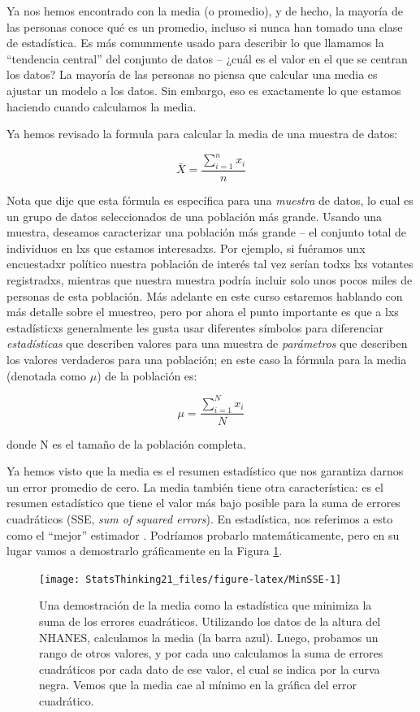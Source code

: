 \documentclass[
  12pt,
]{book}
\begin{document}
Ya nos hemos encontrado con la media (o promedio), y de hecho, la mayoría de las personas conoce qué es un promedio, incluso si nunca han tomado una clase de estadística. Es más comunmente usado para describir lo que llamamos la ``tendencia central'' del conjunto de datos -- ¿cuál es el valor en el que se centran los datos? La mayoría de las personas no piensa que calcular una media es ajustar un modelo a los datos. Sin embargo, eso es exactamente lo que estamos haciendo cuando calculamos la media.

Ya hemos revisado la formula para calcular la media de una muestra de datos:

\[
\bar{X} = \frac{\sum_{i=1}^{n}x_i}{n}
\]

Nota que dije que esta fórmula es específica para una \emph{muestra} de datos, lo cual es un grupo de datos seleccionados de una población más grande. Usando una muestra, deseamos caracterizar una población más grande -- el conjunto total de individuos en lxs que estamos interesadxs. Por ejemplo, si fuéramos unx encuestadxr político nuestra población de interés tal vez serían todxs lxs votantes registradxs, mientras que nuestra muestra podría incluir solo unos pocos miles de personas de esta población. Más adelante en este curso estaremos hablando con más detalle sobre el muestreo, pero por ahora el punto importante es que a lxs estadísticxs generalmente les gusta usar diferentes símbolos para diferenciar \emph{estadísticas} que describen valores para una muestra de \emph{parámetros} que describen los valores verdaderos para una población; en este caso la fórmula para la media (denotada como \(\mu\)) de la población es:

\[
\mu = \frac{\sum_{i=1}^{N}x_i}{N}
\]

donde N es el tamaño de la población completa.

Ya hemos visto que la media es el resumen estadístico que nos garantiza darnos un error promedio de cero. La media también tiene otra característica: es el resumen estadístico que tiene el valor más bajo posible para la suma de errores cuadráticos (SSE, \emph{sum of squared errors}). En estadística, nos referimos a esto como el ``mejor'' estimador . Podríamos probarlo matemáticamente, pero en su lugar vamos a demostrarlo gráficamente en la Figura \ref{fig:MinSSE}.

\begin{figure}
\texttt{[image: StatsThinking21\_files/figure-latex/MinSSE-1]} \caption{Una demostración de la media como la estadística que minimiza la suma de los errores cuadráticos. Utilizando los datos de la altura del NHANES, calculamos la media (la barra azul). Luego, probamos un rango de otros valores, y por cada uno calculamos la suma de errores cuadráticos por cada dato de ese valor, el cual se indica por la curva negra. Vemos que la media cae al mínimo en la gráfica del error cuadrático.}\label{fig:MinSSE}
\end{figure}
\end{document}
